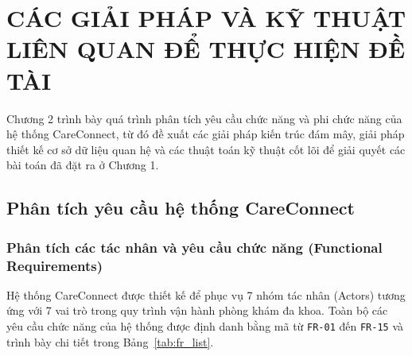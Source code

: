 \chapter{CÁC GIẢI PHÁP VÀ KỸ THUẬT LIÊN QUAN ĐỂ THỰC HIỆN ĐỀ TÀI}

Chương 2 trình bày quá trình phân tích yêu cầu chức năng và phi chức năng của hệ thống CareConnect, từ đó đề xuất các giải pháp kiến trúc đám mây, giải pháp thiết kế cơ sở dữ liệu quan hệ và các thuật toán kỹ thuật cốt lõi để giải quyết các bài toán đã đặt ra ở Chương 1.

\section{Phân tích yêu cầu hệ thống CareConnect}

\subsection{Phân tích các tác nhân và yêu cầu chức năng (Functional Requirements)}

Hệ thống CareConnect được thiết kế để phục vụ 7 nhóm tác nhân (Actors) tương ứng với 7 vai trò trong quy trình vận hành phòng khám đa khoa. Toàn bộ các yêu cầu chức năng của hệ thống được định danh bằng mã từ \texttt{FR-01} đến \texttt{FR-15} và trình bày chi tiết trong Bảng~\ref{tab:fr_list}.


